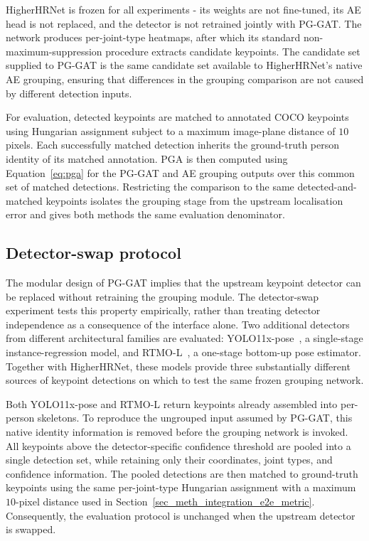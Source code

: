 HigherHRNet is frozen for all experiments -
its weights are not fine-tuned,
its AE head is not replaced,
and the detector is not retrained jointly with PG-GAT.
The network produces per-joint-type heatmaps,
after which its standard non-maximum-suppression procedure
extracts candidate keypoints.
The candidate set supplied to PG-GAT is the same candidate set
available to HigherHRNet's native AE grouping,
ensuring that differences in the grouping comparison are not caused
by different detection inputs.

For evaluation,
detected keypoints are matched to annotated COCO keypoints
using Hungarian assignment subject to a maximum image-plane distance
of $10$ pixels.
Each successfully matched detection inherits the ground-truth person identity
of its matched annotation.
PGA is then computed using Equation~\eqref{eq:pga} for the PG-GAT
and AE grouping outputs over this common set of matched detections.
Restricting the comparison to the same detected-and-matched keypoints
isolates the grouping stage from the upstream localisation error
and gives both methods the same evaluation denominator.

\subsection{Detector-swap protocol}
\label{sec_meth_integration_swap}

The modular design of PG-GAT implies that the upstream keypoint
detector can be replaced without retraining the grouping module.
The detector-swap experiment tests this property empirically,
rather than treating detector independence as a consequence
of the interface alone.
Two additional detectors from different architectural families
are evaluated:
YOLO11x-pose~\cite{ultralytics2024yolo11},
a single-stage instance-regression model,
and RTMO-L~\cite{lu2024rtmo},
a one-stage bottom-up pose estimator.
Together with HigherHRNet,
these models provide three substantially different sources
of keypoint detections on which to test the same frozen grouping network.

Both YOLO11x-pose and RTMO-L return keypoints already assembled into
per-person skeletons.
To reproduce the ungrouped input assumed by PG-GAT,
this native identity information is removed before the grouping network
is invoked.
All keypoints above the detector-specific confidence threshold
are pooled into a single detection set,
while retaining only their coordinates,
joint types,
and confidence information.
The pooled detections are then matched to ground-truth keypoints
using the same per-joint-type Hungarian assignment
with a maximum $10$-pixel distance used in
Section~\ref{sec_meth_integration_e2e_metric}.
Consequently,
the evaluation protocol is unchanged when the upstream detector is swapped.

